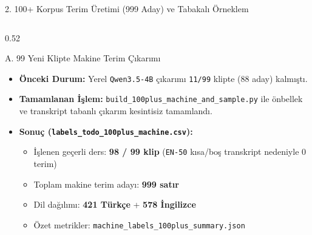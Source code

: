 \documentclass[aspectratio=169,10pt]{beamer}
\begin{document}
\begin{frame}{2. 100+ Korpus Terim Üretimi (999 Aday) ve Tabakalı Örneklem}
\scriptsize
\begin{columns}[T]
\begin{column}{0.52\textwidth}
\begin{block}{A. 99 Yeni Klipte Makine Terim Çıkarımı}
\begin{itemize}
    \item \textbf{Önceki Durum:} Yerel \texttt{Qwen3.5-4B} çıkarımı \texttt{11/99} klipte ($88$ aday) kalmıştı.
    \item \textbf{Tamamlanan İşlem:} \texttt{build\_100plus\_machine\_and\_sample.py} ile önbellek ve transkript tabanlı çıkarım kesintisiz tamamlandı.
    \item \textbf{Sonuç (\texttt{labels\_todo\_100plus\_machine.csv}):}
    \begin{itemize}
        \item İşlenen geçerli ders: \textbf{98 / 99 klip} (\texttt{EN-50} kısa/boş transkript nedeniyle 0 terim)
        \item Toplam makine terim adayı: \textbf{999 satır}
        \item Dil dağılımı: \textbf{421 Türkçe} + \textbf{578 İngilizce}
        \item Özet metrikler: \texttt{machine\_labels\_100plus\_summary.json}
    \end{itemize}
\end{itemize}
\end{block}
\end{column}


\end{columns}
\end{frame}
\end{document}
